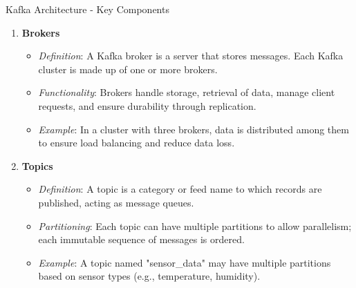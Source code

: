 \documentclass[aspectratio=169]{beamer}
\begin{document}
\begin{frame}[fragile]{Kafka Architecture - Key Components}
    \begin{enumerate}
        \item \textbf{Brokers}
        \begin{itemize}
            \item \textit{Definition}: A Kafka broker is a server that stores messages. Each Kafka cluster is made up of one or more brokers.
            \item \textit{Functionality}: Brokers handle storage, retrieval of data, manage client requests, and ensure durability through replication.
            \item \textit{Example}: In a cluster with three brokers, data is distributed among them to ensure load balancing and reduce data loss.
        \end{itemize}

        \item \textbf{Topics}
        \begin{itemize}
            \item \textit{Definition}: A topic is a category or feed name to which records are published, acting as message queues.
            \item \textit{Partitioning}: Each topic can have multiple partitions to allow parallelism; each immutable sequence of messages is ordered.
            \item \textit{Example}: A topic named "sensor_data" may have multiple partitions based on sensor types (e.g., temperature, humidity).
        \end{itemize}
    \end{enumerate}
\end{frame}
\end{document}
